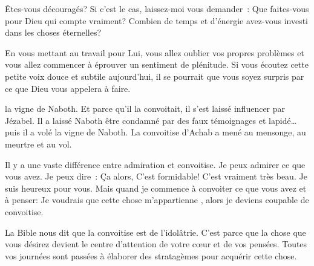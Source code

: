Êtes-vous découragés? Si c'est le cas, laissez-moi vous demander~:
 Que faites-vous pour Dieu qui compte vraiment?
 Combien de temps et d'énergie avez-vous investi dans les choses éternelles?


En vous mettant au travail pour Lui, vous allez oublier vos propres problèmes
 et vous allez commencer à éprouver un sentiment de plénitude.
 Si vous écoutez cette petite voix douce et subtile aujourd'hui,
 il se pourrait que vous soyez surpris par ce que Dieu vous appelera à faire. 

\dvrule






 la vigne de Naboth.
 Et parce qu'il la convoitait, il s'est laissé influencer par Jézabel.
 Il a laissé Naboth être condamné par des faux témoignages et lapidé\dots{}
 puis il a volé la vigne de Naboth.
 La convoitise d'Achab a mené au mensonge, au meurtre et au vol.

Il y a une vaste différence entre admiration et convoitise.
 Je peux admirer ce que vous avez. Je peux dire~:
 \og Ça alors, C'est formidable! C'est vraiment très beau.
 Je suis heureux pour vous. \fg{}
 Mais quand je commence à convoiter ce que vous avez et à penser:
 \og Je voudrais que cette chose m'appartienne \fg{},
 alors je deviens coupable de convoitise. 


La Bible nous dit que la convoitise est de l'idolâtrie.
 C'est parce que la chose que vous désirez devient le centre d'attention
 de votre c\oe{}ur et de vos pensées.
 Toutes vos journées sont passées à élaborer des stratagèmes
 pour acquérir cette chose. 

